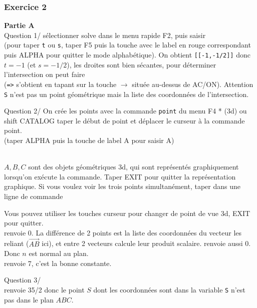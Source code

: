 \documentclass{article}
\begin{document}
\begin{giacjshere}
\subsubsection{Exercice 2}
{\bf Partie A}\\
Question 1/ sélectionner solve dans le menu rapide F2, puis saisir\\
(pour taper {\tt t} ou {\tt s}, taper F5 puis la touche avec
le label en rouge correspondant puis ALPHA pour quitter le mode alphabétique).
On obtient {\tt [[-1,-1/2]]} donc $t=-1$ (et $s=-1/2$), 
les droites sont bien sécantes, pour déterminer l'intersection on peut
faire\\
 ({\tt =>} s'obtient
en tapant sur la touche $\rightarrow$ située au-dessus de AC/ON).
Attention {\tt S} n'est pas un point géométrique 
mais la liste des coordonnées de l'intersection.

Question 2/
On crée les points avec la commande {\tt point} du menu F4 * (3d)
ou shift CATALOG taper le début de point et déplacer le curseur
à la commande point.\\
 (taper ALPHA puis la touche de label A pour saisir A)



\\
$A, B, C$ sont des objets géométriques 3d, qui sont représentés graphiquement
lorsqu'on exécute la commande. Taper EXIT pour quitter la représentation
graphique. Si vous voulez voir les trois points simultanément, taper
dans une ligne de commande \\

Vous pouvez utiliser les touches 
curseur pour changer de point de vue 3d, EXIT pour quitter.\\
 renvoie 0. La différence de 2 points est la liste
des coordonnées du vecteur les reliant ($\overrightarrow{AB}$ ici), 
et {\tt *} entre 2 vecteurs calcule leur produit scalaire.
 renvoie aussi 0.
Donc $n$ est normal au plan.\\
 renvoie 7, 
c'est la bonne constante.

Question 3/ \\
 renvoie 35/2 donc le point $S$ dont les
coordonnées sont dans la variable {\tt S} n'est pas dans le plan $ABC$.


\end{giacjshere}
\end{document}

